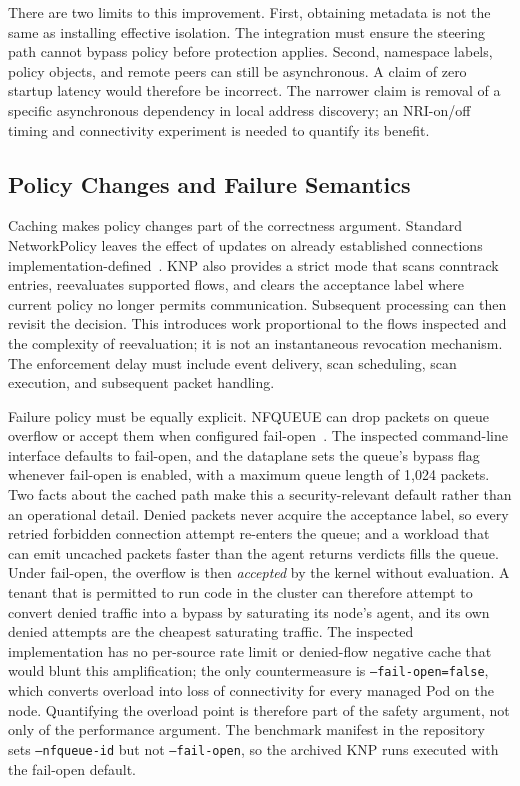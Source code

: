 \documentclass[letterpaper,twocolumn,10pt]{article}
\newcommand{\sys}{\textsc{KNP}}
\begin{document}
There are two limits to this improvement. First, obtaining metadata is
not the same as installing effective isolation. The integration must
ensure the steering path cannot bypass policy before protection applies.
Second, namespace labels, policy objects, and remote peers can still be
asynchronous. A claim of zero startup latency would therefore be incorrect.
The narrower claim is removal of a specific asynchronous dependency in
local address discovery; an NRI-on/off timing and connectivity experiment
is needed to quantify its benefit.

\subsection{Policy Changes and Failure Semantics}
Caching makes policy changes part of the correctness argument. Standard
NetworkPolicy leaves the effect of updates on already established
connections implementation-defined~\cite{k8snetworkpolicy}. \sys{}
also provides a strict mode that scans conntrack entries, reevaluates
supported flows, and clears the acceptance label where current policy
no longer permits communication. Subsequent processing can then revisit
the decision. This introduces work proportional to the flows inspected
and the complexity of reevaluation; it is not an instantaneous revocation
mechanism. The enforcement delay must include event delivery, scan
scheduling, scan execution, and subsequent packet handling.

Failure policy must be equally explicit. NFQUEUE can drop packets on
queue overflow or accept them when configured fail-open~\cite{nfqueueapi}.
The inspected command-line interface defaults to fail-open, and the
dataplane sets the queue's bypass flag whenever fail-open is enabled,
with a maximum queue length of 1,024 packets. Two facts about the cached
path make this a security-relevant default rather than an operational
detail. Denied packets never acquire the acceptance label, so every
retried forbidden connection attempt re-enters the queue; and a workload
that can emit uncached packets faster than the agent returns verdicts
fills the queue. Under fail-open, the overflow is then \emph{accepted}
by the kernel without evaluation. A tenant that is permitted to run code
in the cluster can therefore attempt to convert denied traffic into a
bypass by saturating its node's agent, and its own denied attempts are
the cheapest saturating traffic. The inspected implementation has no
per-source rate limit or denied-flow negative cache that would blunt this
amplification; the only countermeasure is \texttt{--fail-open=false},
which converts overload into loss of connectivity for every managed Pod
on the node. Quantifying the overload point is therefore part of the
safety argument, not only of the performance argument. The benchmark
manifest in the repository sets \texttt{--nfqueue-id} but not
\texttt{--fail-open}, so the archived \sys{} runs executed with the
fail-open default.
\end{document}
